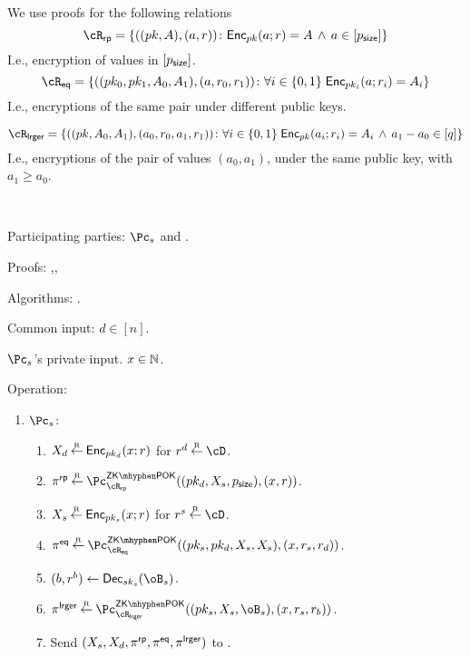 We use proofs for the   following  relations  
$$\rRP =\rRPDef$$
I.e., encryption of values in $[p_{\mathsf{size}}]$.
$$\rEQ =\rEQDef$$
I.e., encryptions of the same pair under different public keys.


$$\rLrg =\rLrgDef$$
I.e., encryptions of the  pair of values $(a_0,a_1)$, under the same public key, with $a_1 \ge a_0$.

\begin{protocol}~\label{prot:ConfidentialTransactions:Transfer}
	\item[Participating parties:] $\Pc_s$ and \Cc.
	
\item[Proofs:]   \piZKPOK{\rRP},\pZKPOK{\rEQ},\pZKPOK{\rLrg}


\item[Algorithms:]    \Dec.

	
	\item[Common input:] $d\in [n]$.
	
	\item[$\Pc_s$'s private  input.] $x \in {\mathbb{N}}$.
	
\item[Operation:] ~
	
	\begin{enumerate}
		\item  $\Pc_s$: 
		
		\begin{enumerate}
			\item $X_d \mathbin{\stackrel{\mbox{\tiny R}}{\leftarrow}} \mathsf{Enc}_{pk_d}(x;r)$ for $r^d \getsr \cD$.
			
		
			\item $\pi^\RPs \getsr \pZKPOK{\rRP}((pk_d,X_s,\psize),(x,r))$.
			
			
			\item $X_s \mathbin{\stackrel{\mbox{\tiny R}}{\leftarrow}} \mathsf{Enc}_{pk_s}(x;r)$ for $r^s \getsr \cD$.
			
			
			
			\item $\pi^\Eqs \getsr \pZKPOK{\rEQ}((pk_s,pk_d,X_s,X_s),(x,r_s,r_d))$.
			
			
			\item $(b,r^b) \asn \Dec_{sk_s}(\oB_s)$.
			
			
			\item $\pi^\Lrgs \getsr \pZKPOK{\rLrg}((pk_s,X_s,\oB_s),(x,r_s,r_b))$.
			
			
			\item Send $(X_s,X_d,\pi^{\sf rp},\pi^{\sf eq},\pi^{\sf lrger})$ to \Cc.
		\end{enumerate}
		

\end{enumerate}
\end{protocol}
